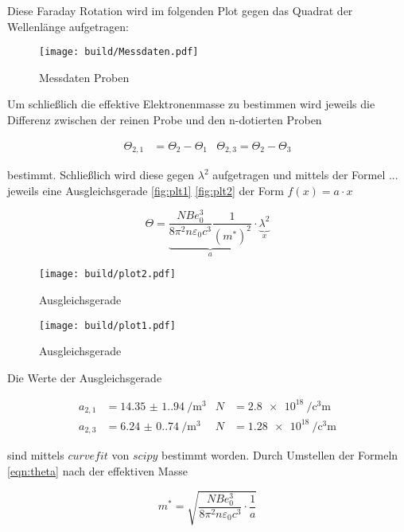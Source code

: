 Diese Faraday Rotation wird im folgenden Plot gegen das Quadrat der Wellenlänge aufgetragen: 

\begin{figure}[H]
	\centering
	\texttt{[image: build/Messdaten.pdf]}
	\caption{Messdaten Proben}\label{fig:Aufbau}
\end{figure}

Um schließlich die effektive Elektronenmasse zu bestimmen wird jeweils die Differenz zwischen der reinen Probe und den n-dotierten Proben

\begin{align*}
    \Theta_{2,1}&=\Theta_2-\Theta_1  & \Theta_{2,3}=\Theta_2-\Theta_3
\end{align*}

bestimmt.
Schließlich wird diese gegen $\lambda^2$ aufgetragen und mittels der Formel ... jeweils eine Ausgleichsgerade \eqref{fig:plt1} \eqref{fig:plt2} der Form $f(x)=a\cdot x$

\begin{equation}
    \Theta=\underbrace{\frac{NBe_0^3}{8 \pi^2 n \varepsilon_0 c^3} \frac{1}{(m^{\ast})^2}}_{a} \cdot \underbrace{\lambda^2}_{x}
    \label{eqn:theta}
\end{equation}

\begin{figure}[H]
	\centering
	\texttt{[image: build/plot2.pdf]}
	\caption{Ausgleichsgerade}\label{fig:plt1}
\end{figure}

\begin{figure}[H]
	\centering
	\texttt{[image: build/plot1.pdf]}
	\caption{Ausgleichsgerade}\label{fig:plt2}
\end{figure}

Die Werte der Ausgleichsgerade 

\begin{align}
    a_{2,1}&=\qty{14.35(1.94)}{\per\cubic\meter} & N&=\qty{2.8e18}{\per\cubic\centi\meter}\\
    a_{2,3}&=\qty{6.24(0.74)}{\per\cubic\meter}  & N&=\qty{1.28e18}{\per\cubic\centi\meter}
\end{align}

sind mittels $curvefit$ von $scipy$ \cite{scipy} bestimmt worden.
Durch Umstellen der Formeln \eqref{eqn:theta} nach der effektiven Masse

\begin{equation}
    m^{\ast}=\sqrt{\frac{NBe_0^3}{8 \pi^2 n \varepsilon_0 c^3} \cdot \frac{1}{a}}
\end{equation}

